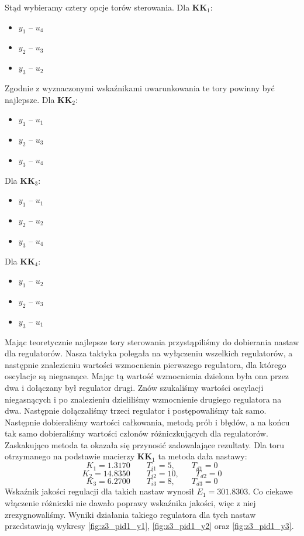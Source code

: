 Stąd wybieramy cztery opcje torów sterowania. Dla $\bm{KK}_1$:
\begin{itemize}
  \item $y_1$ -- $u_4$
 \item $y_2$ -- $u_3$
 \item $y_3$ -- $u_2$
\end{itemize}
Zgodnie z wyznaczonymi wskaźnikami uwarunkowania te tory powinny być najlepsze. Dla $\bm{KK}_2$:
\begin{itemize}
  \item $y_1$ -- $u_1$
 \item $y_2$ -- $u_3$
 \item $y_3$ -- $u_4$
\end{itemize}
Dla $\bm{KK}_3$:
\begin{itemize}
  \item $y_1$ -- $u_1$
 \item $y_2$ -- $u_2$
 \item $y_3$ -- $u_4$
\end{itemize}
Dla $\bm{KK}_4$:
\begin{itemize}
  \item $y_1$ -- $u_2$
 \item $y_2$ -- $u_3$
 \item $y_3$ -- $u_1$
\end{itemize}
Mając teoretycznie najlepsze tory sterowania przystąpiliśmy do dobierania nastaw
dla regulatorów. Nasza taktyka polegała na wyłączeniu wszelkich regulatorów, a
następnie znalezieniu wartości wzmocnienia pierwszego regulatora, dla którego
oscylacje są niegasnące. Mając tą wartość wzmocnienia dzielona była ona przez
dwa i dołączany był regulator drugi. Znów szukaliśmy wartości oscylacji niegasnących
i po znalezieniu dzieliliśmy wzmocnienie drugiego regulatora na dwa. Następnie
dołączaliśmy trzeci regulator i postępowaliśmy tak samo. Następnie dobieraliśmy
wartości całkowania, metodą prób i błędów, a na końcu tak samo dobieraliśmy
wartości członów różniczkujących dla regulatorów. Zaskakująco metoda ta okazała się
przynosić zadowalające rezultaty. Dla toru otrzymanego na podstawie macierzy $\bm{KK}_1$
ta metoda dała nastawy:
\begin{equation}
  K_1 = \num{1.3170} \qquad T_{i1} = 5, \qquad T_{d1} = 0 \nonumber
\end{equation}
\begin{equation}
  K_2 = \num{14.8350} \qquad T_{i2} = 10, \qquad T_{d2} = 0
\end{equation}
\begin{equation}
  K_3 = \num{6.2700} \qquad T_{i3} = 8, \qquad T_{d3} = 0 \nonumber
\end{equation}
Wskaźnik jakości regulacji dla takich nastaw wynosił $E_1 = \num{301.8303}$.
Co ciekawe włączenie różniczki nie dawało poprawy wskaźnika jakości, więc z niej
zrezygnowaliśmy.
Wyniki działania takiego regulatora dla tych nastaw przedstawiają wykresy \ref{fig:z3_pid1_y1},
\ref{fig:z3_pid1_y2} oraz \ref{fig:z3_pid1_y3}.

